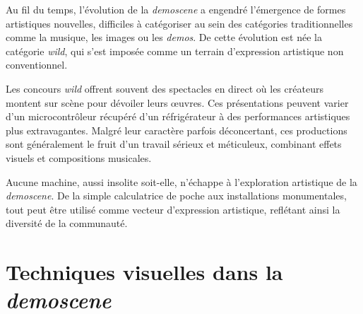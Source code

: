 Au fil du temps, l'évolution de la \textit{demoscene} a engendré l'émergence de formes artistiques nouvelles, difficiles à catégoriser au sein des catégories traditionnelles comme la musique, les images ou les \textit{demos}. De cette évolution est née la catégorie \textit{wild}, qui s'est imposée comme un terrain d'expression artistique non conventionnel.

Les concours \textit{wild} offrent souvent des spectacles en direct où les créateurs montent sur scène pour dévoiler leurs œuvres. Ces présentations peuvent varier d'un microcontrôleur récupéré d'un réfrigérateur à des performances artistiques plus extravagantes. Malgré leur caractère parfois déconcertant, ces productions sont généralement le fruit d'un travail sérieux et méticuleux, combinant effets visuels et compositions musicales.





Aucune machine, aussi insolite soit-elle, n'échappe à l'exploration artistique de la \textit{demoscene}. De la simple calculatrice de poche aux installations monumentales, tout peut être utilisé comme vecteur d'expression artistique, reflétant ainsi la diversité de la communauté.






\section{Techniques visuelles dans la \textit{demoscene}}

